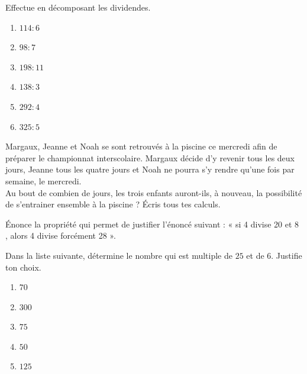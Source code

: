 \documentclass[../../syllabus_1.tex]{subfiles}
\begin{document}
%
\begin{exercise}
      Effectue en décomposant les dividendes.
      \begin{enumerate}[cols=3]
            \item $114:6$
            \item $98:7$
            \item $198:11$
            \item $138:3$
            \item $292:4$
            \item $325:5$
      \end{enumerate}
\end{exercise}

\begin{exercise}
      Margaux, Jeanne et Noah se sont retrouvés à la piscine ce mercredi afin de préparer le championnat interscolaire. Margaux décide d'y revenir tous les deux jours, Jeanne tous les quatre jours et Noah ne pourra s'y rendre qu'une fois par semaine, le mercredi. \\
      Au bout de combien de jours, les trois enfants auront-ils, à nouveau, la possibilité de s'entrainer ensemble à la piscine ? Écris tous tes calculs.
\end{exercise}

\begin{exercise}
      Énonce la propriété qui permet de justifier l'énoncé suivant : « si 4 divise 20 et 8 , alors 4 divise forcément 28 ».
\end{exercise}

\begin{exercise}
      Dans la liste suivante, détermine le nombre qui est multiple de \(25\) et de \(6\). Justifie ton choix.
      \begin{enumerate}[label=\ , cols=5 ]
            \item $70$
            \item $300$
            \item $75$
            \item $50$
            \item $125$
      \end{enumerate}
\end{exercise}
\end{document}
